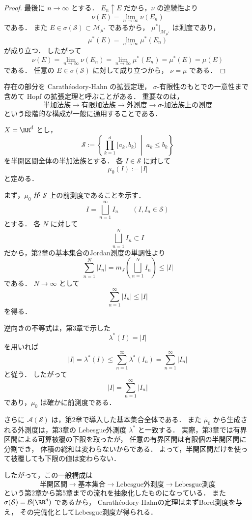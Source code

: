 \begin{proof}
最後に $n\to\infty$ とする．
$E_n \uparrow E$ だから，$\nu$ の連続性より
\[
\nu(E)=\lim_{n\to\infty}\nu(E_n)
\]
である．
また $E \in \sigma(\mathcal S)\subset \mathcal M_{\mu^*}$ であるから，
$\mu^*|_{\mathcal M_{\mu^*}}$ は測度であり，
\[
\mu^*(E)=\lim_{n\to\infty}\mu^*(E_n)
\]
が成り立つ．
したがって
\[
\nu(E)
=
\lim_{n\to\infty}\nu(E_n)
=
\lim_{n\to\infty}\mu^*(E_n)
=
\mu^*(E)
=
\mu(E)
\]
である．
任意の $E \in \sigma(\mathcal S)$ に対して成り立つから，
$\nu=\mu$ である．
\end{proof}

\begin{remark}
存在の部分を Carathéodory-Hahn の拡張定理，
$\sigma$-有限性のもとでの一意性まで含めて Hopf の拡張定理と呼ぶことがある．
重要なのは，
\[
\text{半加法族}
\longrightarrow
\text{有限加法族}
\longrightarrow
\text{外測度}
\longrightarrow
\sigma\text{-加法族上の測度}
\]
という段階的な構成が一般に通用することである．
\end{remark}

\begin{example}[Lebesgue測度の構成]
$X=\RR^d$ とし，
\[
\mathcal S
:=
\left\{
\prod_{k=1}^d [a_k,b_k)
\;\middle|\;
a_k \le b_k
\right\}
\]
を半開区間全体の半加法族とする．
各 $I \in \mathcal S$ に対して
\[
\mu_0(I):=|I|
\]
と定める．

まず，$\mu_0$ が $\mathcal S$ 上の前測度であることを示す．
\[
I=\bigsqcup_{n=1}^{\infty}I_n
\qquad
(I,I_n \in \mathcal S)
\]
とする．
各 $N$ に対して
\[
\bigsqcup_{n=1}^N I_n \subset I
\]
だから，第2章の基本集合のJordan測度の単調性より
\[
\sum_{n=1}^N |I_n|
=
m_J\left(\bigsqcup_{n=1}^N I_n\right)
\le
|I|
\]
である．
$N\to\infty$ として
\[
\sum_{n=1}^{\infty}|I_n|\le |I|
\]
を得る．

逆向きの不等式は，第3章で示した
\[
\lambda^*(I)=|I|
\]
を用いれば
\[
|I|
=
\lambda^*(I)
\le
\sum_{n=1}^{\infty}\lambda^*(I_n)
=
\sum_{n=1}^{\infty}|I_n|
\]
と従う．
したがって
\[
|I|=\sum_{n=1}^{\infty}|I_n|
\]
であり，$\mu_0$ は確かに前測度である．

さらに $\mathcal A(\mathcal S)$ は，第2章で導入した基本集合全体である．
また $\overline{\mu}_0$ から生成される外測度は，第3章の
Lebesgue外測度 $\lambda^*$ と一致する．
実際，第3章では有界区間による可算被覆の下限を取ったが，
任意の有界区間は有限個の半開区間に分割でき，
体積の総和は変わらないからである．
よって，半開区間だけを使って被覆しても下限の値は変わらない．

したがって，この一般構成は
\[
\text{半開区間}
\longrightarrow
\text{基本集合}
\longrightarrow
\text{Lebesgue外測度}
\longrightarrow
\text{Lebesgue測度}
\]
という第2章から第5章までの流れを抽象化したものになっている．
また $\sigma(\mathcal S)=\mathcal B(\RR^d)$ であるから，
Carathéodory-Hahnの定理はまずBorel測度を与え，
その完備化としてLebesgue測度が得られる．
\end{example}

